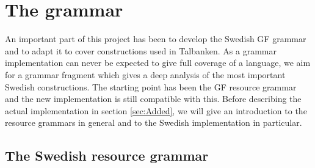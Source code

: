 \documentclass{report}
\begin{document}
\chapter{The grammar}
\label{sec:prog.grammar}
An important part of this project has been to develop the Swedish GF grammar and
to adapt it to cover
constructions used in Talbanken. As a grammar implementation can never be
expected to give
full coverage of a language, we aim for a grammar fragment which gives a deep
analysis of the most important Swedish constructions.
The starting point has been the GF resource grammar and the new implementation is
still compatible with this.
Before describing the actual implementation in section \ref{sec:Added}, we will give an introduction to the
resource grammars in general and to the Swedish implementation in particular.



\section{The Swedish resource grammar}
\label{sec:swegf}
\end{document}
